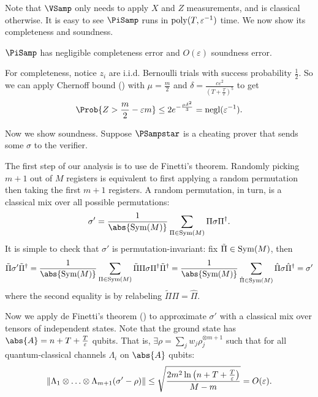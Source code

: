 Note that $\VSamp$  only needs to apply $X$ and $Z$ measurements, and is classical otherwise.
It is easy to see $\PiSamp$ runs in $\operatorname*{\operatorname{poly}}(T, \varepsilon^{-1})$ time.
We now show its completeness and soundness.

\begin{thm}
    \label{QPIP1thm}
	$\PiSamp$ has negligible completeness error and $O(\varepsilon)$ soundness error.
\end{thm}
\begin{prf}
	For completeness, notice $z_i$ are i.i.d. Bernoulli trials with success probability $\frac{1}{2}$.
	So we can apply Chernoff bound ()  with $\mu=\frac{m}{2}$ and $\delta=\frac{c\varepsilon^2}{\left(T+\frac{T}{\varepsilon}\right)^5}$ to get
	$$\Prob{Z>\frac{m}{2}-\varepsilon m}\leq2e^{-\frac{\mu\delta^2}{3}}=\negl(\varepsilon^{-1}).$$

	Now we show soundness.
	Suppose $\PSampstar$ is a cheating prover that sends some $\sigma$ to the verifier.

	The first step of our analysis is to use de Finetti's theorem.
	Randomly picking $m+1$ out of $M$ registers is equivalent to first applying a random permutation then taking the first $m+1$ registers.
	A random permutation, in turn, is a classical mix over all possible permutations:
	$$\sigma'=\frac{1}{\abs{\Sym(M)}}\sum_{\Pi\in\Sym(M)}\Pi\sigma\Pi^\dagger.$$
	It is simple to check that $\sigma'$ is permutation-invariant:
	fix $\tilde{\Pi}\in\operatorname{Sym}(M)$, then
	$$\tilde{\Pi}\sigma'\tilde{\Pi}^\dagger
	=\frac{1}{\abs{\Sym(M)}}\sum_{\Pi\in\Sym(M)}\tilde{\Pi}\Pi\sigma\Pi^\dagger\tilde{\Pi}^\dagger
	=\frac{1}{\abs{\Sym(M)}}\sum_{\hat{\Pi}\in\Sym(M)}\hat{\Pi}\sigma\hat{\Pi}^\dagger
	=\sigma'$$
	where the second equality is by relabeling $\tilde{\Pi}\Pi=\hat{\Pi}$.

	Now we apply de Finetti's theorem () to approximate $\sigma'$ with a classical mix over tensors of independent states.
	Note that the ground state has $\abs{A}=n+T+\frac{T}{\varepsilon}$ qubits.
	That is,  $\exists\rho=\sum_j w_j\rho_j^{\otimes m+1}$
	such that for all quantum-classical channels $\Lambda_i$ on $\abs{A}$ qubits:
	$$\left\lVert\Lambda_1\otimes\ldots\otimes\Lambda_{m+1}(\sigma'-\rho)\right\rVert
	\leq\sqrt{\frac{2m^2\ln\left(n+T+\frac{T}{\varepsilon}\right)}{M-m}}
	=O(\varepsilon).$$
	

\end{prf}
